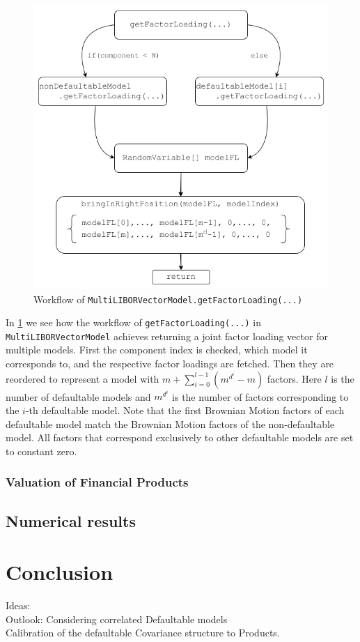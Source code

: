 \documentclass[12pt]{article}
\begin{document}
	\begin{figure}[h]
		\centering
		\includegraphics[width=0.6\linewidth]{figures/MultiModelGetFactorLoading}
		\caption[Workflow of \texttt{MultiLIBORVectorModel.getFactorLoading(...)}]{Workflow of \texttt{MultiLIBORVectorModel.getFactorLoading(...)}}
		\label{fig:multimodelgetfactorloading}
	\end{figure}
	
	In \cref{fig:multimodelgetfactorloading} we see how the workflow of \texttt{getFactorLoading(...)} in \texttt{MultiLIBORVectorModel} achieves returning a joint factor loading vector for multiple models. First the component index is checked, which model it corresponds to, and the respective factor loadings are fetched. Then they are reordered to represent a model with $m + \sum_{i=0}^{l-1}\left(m^{d^i}-m\right)$ factors. Here $l$ is the number of defaultable models and $m^{d^i}$ is the number of factors corresponding to the $i$-th defaultable model. Note that the first Brownian Motion factors of each defaultable model match the Brownian Motion factors of the non-defaultable model. All factors that correspond exclusively to other defaultable models are set to constant zero.
	
	\subsubsection*{Valuation of Financial Products}
	
	\subsection{Numerical results}
	
	
	\pagebreak
	\section{Conclusion}\label{sec:conclusion}
	Ideas:\\
	Outlook: Considering correlated Defaultable models\\
	Calibration of the defaultable Covariance structure to Products.
	
\end{document}
